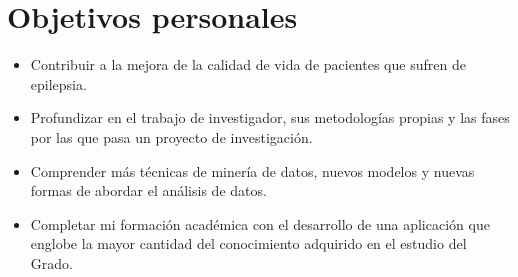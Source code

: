 \section{Objetivos personales}

\begin{itemize}
	\item Contribuir a la mejora de la calidad de vida de pacientes que sufren de epilepsia.
	\item Profundizar en el trabajo de investigador, sus metodologías propias y las fases por las que pasa un proyecto de investigación.
	\item Comprender más técnicas de minería de datos, nuevos modelos y nuevas formas de abordar el análisis de datos.
	\item Completar mi formación académica con el desarrollo de una aplicación que englobe la mayor cantidad del conocimiento adquirido en el estudio del Grado.
\end{itemize}